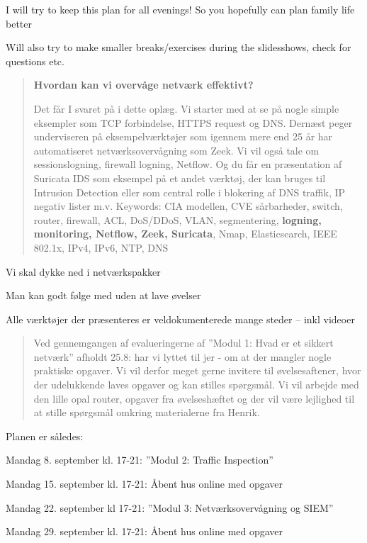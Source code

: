 \documentclass[Screen16to9,17pt]{foils}
\begin{document}
\centerline{I will try to keep this plan for all evenings! So you hopefully can plan family life better}

Will also try to make smaller breaks/exercises during the slidesshows, check for questions etc.





\begin{quote}
{\bf Hvordan kan vi overvåge netværk effektivt?}

    Det får I svaret på i dette oplæg. Vi starter med at se på nogle simple eksempler som TCP forbindelse, HTTPS request og DNS. Dernæst peger underviseren på eksempelværktøjer som igennem mere end 25 år har automatiseret netværksovervågning som Zeek. Vi vil også tale om sessionslogning, firewall logning, Netflow. Og du får en præsentation af Suricata IDS som eksempel på et andet værktøj, der kan bruges til Intrusion Detection eller som central rolle i blokering af DNS traffik, IP negativ lister m.v.
\vskip 5mm
Keywords: CIA modellen, CVE sårbarheder, switch, router, firewall, ACL, DoS/DDoS, VLAN, segmentering, {\bf logning, monitoring, Netflow, Zeek, Suricata}, Nmap, Elasticsearch, IEEE 802.1x, IPv4, IPv6, NTP, DNS
\end{quote}

\begin{list2}
\item Vi skal dykke ned i netværkspakker
\item Man kan godt følge med uden at lave øvelser
\item Alle værktøjer der præsenteres er veldokumenterede mange steder -- inkl videoer
\end{list2}


\begin{quote}
Ved gennemgangen af evalueringerne af ”Modul 1: Hvad er et sikkert netværk” afholdt 25.8: har vi lyttet til jer - om at der mangler nogle praktiske opgaver. Vi vil derfor meget gerne invitere til øvelsesaftener, hvor der udelukkende laves opgaver og kan stilles spørgsmål. Vi vil arbejde med den lille opal router, opgaver fra øvelseshæftet og der vil være lejlighed til at stille spørgsmål omkring materialerne fra Henrik.
\end{quote}

Planen er således:
\begin{list2}
\item Mandag 8. september kl. 17-21: ”Modul 2: Traffic Inspection”
\item Mandag 15. september kl. 17-21: Åbent hus online med opgaver
\item Mandag 22. september kl 17-21: ”Modul 3: Netværksovervågning og SIEM”
\item Mandag 29. september kl. 17-21: Åbent hus online med opgaver
\end{list2}
\end{document}
